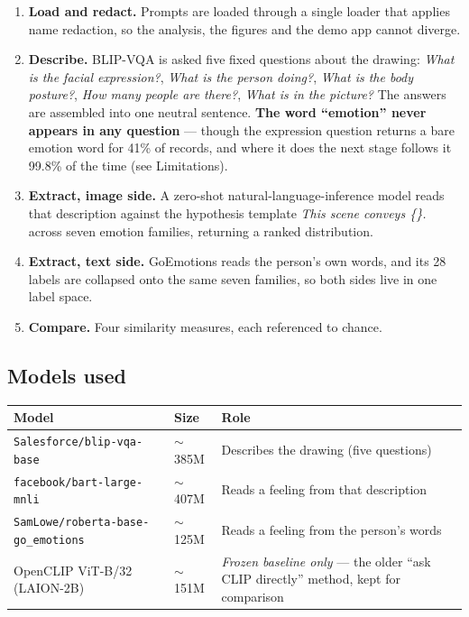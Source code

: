 \documentclass[11pt,a4paper]{article}
\newcommand{\say}[1]{\textit{\color{soft}#1}}
\begin{document}
\begin{enumerate}
\item \textbf{Load and redact.} Prompts are loaded through a single loader that applies name
redaction, so the analysis, the figures and the demo app cannot diverge.
\item \textbf{Describe.} BLIP-VQA is asked five fixed questions about the drawing: \say{What is the
facial expression?}, \say{What is the person doing?}, \say{What is the body posture?}, \say{How many
people are there?}, \say{What is in the picture?} The answers are assembled into one neutral
sentence. \textbf{The word ``emotion'' never appears in any question} --- though the expression
question returns a bare emotion word for 41\% of records, and where it does the next stage follows
it 99.8\% of the time (see Limitations).
\item \textbf{Extract, image side.} A zero-shot natural-language-inference model reads that
description against the hypothesis template \say{This scene conveys \{\}.} across seven emotion
families, returning a ranked distribution.
\item \textbf{Extract, text side.} GoEmotions reads the person's own words, and its 28 labels are
collapsed onto the same seven families, so both sides live in one label space.
\item \textbf{Compare.} Four similarity measures, each referenced to chance.
\end{enumerate}

\subsection{Models used}

\begin{center}
\begin{tabular}{@{}llp{5.6cm}@{}}
\toprule
\textbf{Model} & \textbf{Size} & \textbf{Role}\\
\midrule
\texttt{Salesforce/blip-vqa-base} & $\sim$385M & Describes the drawing (five questions)\\
\texttt{facebook/bart-large-mnli} & $\sim$407M & Reads a feeling from that description\\
\texttt{SamLowe/roberta-base-go\_emotions} & $\sim$125M & Reads a feeling from the person's words\\
\midrule
OpenCLIP ViT-B/32 (LAION-2B) & $\sim$151M & \emph{Frozen baseline only} --- the older
``ask CLIP directly'' method, kept for comparison\\
\bottomrule
\end{tabular}
\end{center}
\end{document}

